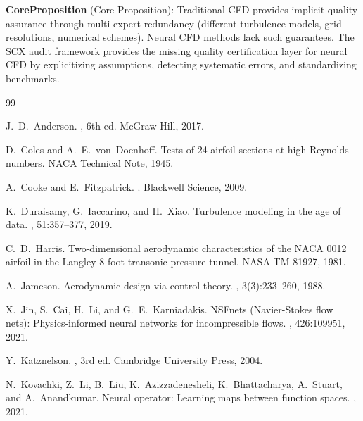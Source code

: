 \documentclass[11pt,a4paper]{article}
\theoremstyle{definition}
\theoremstyle{remark}
\begin{document}
\noindent \textbf{CoreProposition} (Core Proposition): Traditional CFD provides implicit quality assurance through multi-expert redundancy (different turbulence models, grid resolutions, numerical schemes). Neural CFD methods lack such guarantees. The SCX audit framework provides the missing quality certification layer for neural CFD by explicitizing assumptions, detecting systematic errors, and standardizing benchmarks.

\begin{thebibliography}{99}

J.~D.~Anderson.
, 6th ed.
\newblock McGraw-Hill, 2017.

D.~Coles and A.~E.~von~Doenhoff.
\newblock Tests of 24 airfoil sections at high Reynolds numbers.
\newblock NACA Technical Note, 1945.

A.~Cooke and E.~Fitzpatrick.
.
\newblock Blackwell Science, 2009.

K.~Duraisamy, G.~Iaccarino, and H.~Xiao.
\newblock Turbulence modeling in the age of data.
, 51:357--377, 2019.

C.~D.~Harris.
\newblock Two-dimensional aerodynamic characteristics of the NACA 0012 airfoil in the Langley 8-foot transonic pressure tunnel.
\newblock NASA TM-81927, 1981.

A.~Jameson.
\newblock Aerodynamic design via control theory.
, 3(3):233--260, 1988.

X.~Jin, S.~Cai, H.~Li, and G.~E.~Karniadakis.
\newblock NSFnets (Navier-Stokes flow nets): Physics-informed neural networks for incompressible flows.
, 426:109951, 2021.

Y.~Katznelson.
, 3rd ed.
\newblock Cambridge University Press, 2004.

N.~Kovachki, Z.~Li, B.~Liu, K.~Azizzadenesheli, K.~Bhattacharya, A.~Stuart, and A.~Anandkumar.
\newblock Neural operator: Learning maps between function spaces.
, 2021.


\end{thebibliography}
\end{document}

